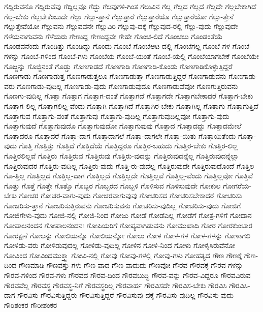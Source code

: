 {ಗೆದ್ದಿರುವನೊ
ಗೆದ್ದಿರುವೆವು
ಗೆದ್ದಿಲ್ಲವೊ
ಗೆದ್ದು
ಗೆಲವುಗಳಿ-ಗಿಂತ
ಗೆಲುವಿನ
ಗೆಲ್ಲ
ಗೆಲ್ಲದ
ಗೆಲ್ಲದೆ
ಗೆಲ್ಲದೇ
ಗೆಲ್ಲಬೇಕಾಗಿದೆ
ಗೆಲ್ಲ-ಬೇಕು
ಗೆಲ್ಲಬೇಕೆಂಬುದೇ
ಗೆಲ್ಲು
ಗೆಲ್ಲು-ತ್ತಾನೆ
ಗೆಲ್ಲುತ್ತಾರೆ
ಗೆಲ್ಲುತ್ತಾರೆಯೊ
ಗೆಲ್ಲುತ್ತಾರೆಯೋ
ಗೆಲ್ಲು-ತ್ತೇನೆ
ಗೆಲ್ಲುತ್ತೇವೆಯೋ
ಗೆಲ್ಲುವನು
ಗೆಲ್ಲುವವನೇ
ಗೆಲ್ಲುವಿರಿ
ಗೆಲ್ಲುವು-ದಕ್ಕೆ
ಗೆಲ್ಲುವುದ-ರಲ್ಲಿ
ಗೆಲ್ಲು-ವುದು
ಗೆಲ್ಲುವುದೇ
ಗೆಳೆಯನಾಗುವನು
ಗೆಳೆಯರು
ಗೇಣುದ್ದ
ಗೇಣುದ್ದವೇ
ಗೇಹೇ
ಗೊಂಚ-ಲಿದೆ
ಗೊಂಚಲು
ಗೊಂಡಂತೆಯೆ
ಗೊಂಡವನೆಂದು
ಗೊಂಡಿತ್ತು
ಗೊಂಡಿದ್ದು
ಗೊಂದು
ಗೊಂಬೆ
ಗೊಂಬೆಆಟ-ದಲ್ಲಿ
ಗೊಂಬೆಗಲ್ಲ
ಗೊಂಬೆ-ಗಳ
ಗೊಂಬೆ-ಗಳನ್ನು
ಗೊಂಬೆ-ಗಳಿಂದ
ಗೊಂಬೆ-ಗಳು
ಗೊಂಬೆಯ
ಗೊಂಬೆ-ಯಂತೆ
ಗೊಂಬೆ-ಯಲ್ಲಿ
ಗೊಂಬೆಯಾಗಬೇಕೆ
ಗೊಂಬೆಯೇ
ಗೊಜ್ಜನ್ನು
ಗೊಜ್ಜಿನಂತೆ
ಗೊಡ್ಡು
ಗೊಣಗಾಡದೆ
ಗೊಣಗಾಡಿ
ಗೊಣಗಾಡಿ-ಕೊಂಡು
ಗೊಣಗಾಡಿಕೊಳ್ಳುತ್ತಿದ್ದರೆ
ಗೊಣಗಾಡು
ಗೊಣಗಾಡುತ್ತ
ಗೊಣಗಾಡುತ್ತಲೂ
ಗೊಣಗಾಡುತ್ತಾ
ಗೊಣಗಾಡುತ್ತಿದ್ದರೆ
ಗೊಣಗಾಡುವನು
ಗೊಣಗಾಡು-ವರು
ಗೊಣಗಾಡು-ವುದಿಲ್ಲ
ಗೊಣಗಾಡು-ವುದು
ಗೊಣಗಾಡುವುದೂ
ಗೊಣಗಾಡುವೆವೋ
ಗೊಣಗುತ್ತಿರುವನು
ಗೊಣಗು-ವುದಿಲ್ಲ
ಗೊತ್ತಾ
ಗೊತ್ತಾಗ
ಗೊತ್ತಾಗ-ದಂತೆ
ಗೊತ್ತಾಗದೆ
ಗೊತ್ತಾಗದೇ
ಗೊತ್ತಾಗಬೇಕಾದರೆ
ಗೊತ್ತಾಗ-ಬೇಕು
ಗೊತ್ತಾಗ-ಲಿಲ್ಲ
ಗೊತ್ತಾಗಲಿಲ್ಲ-ವೆಂದು
ಗೊತ್ತಾಗಿ
ಗೊತ್ತಾಗಿದೆ
ಗೊತ್ತಾಗಿರ-ಬೇಕು
ಗೊತ್ತಾಗಿಲ್ಲ
ಗೊತ್ತಾಗು
ಗೊತ್ತಾಗುತ್ತಿದೆ
ಗೊತ್ತಾಗುವ
ಗೊತ್ತಾಗು-ವಂತೆ
ಗೊತ್ತಾಗುವು
ಗೊತ್ತಾಗು-ವುದಿಲ್ಲ
ಗೊತ್ತಾಗುವುದಿಲ್ಲವೋ
ಗೊತ್ತಾಗು-ವುದು
ಗೊತ್ತಾಗುವುದೆ
ಗೊತ್ತಾಗುವುದೊ
ಗೊತ್ತಾಗುವುದೋ
ಗೊತ್ತಾಗುವುವು
ಗೊತ್ತಾದ
ಗೊತ್ತಾದದ್ದು
ಗೊತ್ತಾದಮೇಲೆ
ಗೊತ್ತಾದರೂ
ಗೊತ್ತಾದರೆ
ಗೊತ್ತಾ-ದಾಗ
ಗೊತ್ತಾದಾಗಲೆ
ಗೊತ್ತಾ-ದಾಗಲೇ
ಗೊತ್ತಾ-ಯಿತು
ಗೊತ್ತಾಯಿತೆಂದು
ಗೊತ್ತಾ-ವುದು
ಗೊತ್ತಿ
ಗೊತ್ತಿತ್ತು
ಗೊತ್ತಿದೆ
ಗೊತ್ತಿದೆಯೆ
ಗೊತ್ತಿದ್ದರೂ
ಗೊತ್ತಿರ-ಬಹುದು
ಗೊತ್ತಿರ-ಬೇಕು
ಗೊತ್ತಿರ-ಲಿಲ್ಲ
ಗೊತ್ತಿರಲಿಲ್ಲವೆ
ಗೊತ್ತಿರು
ಗೊತ್ತಿರುವ
ಗೊತ್ತಿರುವು
ಗೊತ್ತಿರು-ವುದನ್ನು
ಗೊತ್ತಿರುವುದನ್ನೆಲ್ಲ
ಗೊತ್ತಿರುವುದನ್ನೆಲ್ಲಾ
ಗೊತ್ತಿರುವುದರ
ಗೊತ್ತಿರು-ವುದಿಲ್ಲ
ಗೊತ್ತಿರು-ವುದು
ಗೊತ್ತಿ-ರು-ವುದೆಲ್ಲ
ಗೊತ್ತಿರುವುದೇ
ಗೊತ್ತಿರುವುದೊಂದೆ
ಗೊತ್ತಿಲ
ಗೊ-ತ್ತಿಲ್ಲ
ಗೊತ್ತಿಲ್ಲದ
ಗೊತ್ತಿಲ್ಲ-ದಾಗ
ಗೊತ್ತಿಲ್ಲದೆ
ಗೊತ್ತಿಲ್ಲದೇ
ಗೊತ್ತಿಲ್ಲವೆ
ಗೊತ್ತಿಲ್ಲ-ವೆಂದು
ಗೊತ್ತಿಲ್ಲವೋ
ಗೊತ್ತಿವೆ
ಗೊತ್ತು
ಗೊತ್ತೆ
ಗೊತ್ತೇ
ಗೊತ್ತೊ
ಗೊಬ್ಬರ
ಗೊಬ್ಬರದ
ಗೊಬ್ಬಳಿ
ಗೊಳಿಸುವ
ಗೊಳಿಸುವುದೇ
ಗೋಕುಲ
ಗೋಗರೆಯ-ಬೇಕು
ಗೋಚರ
ಗೋಚರ-ವಾಗು-ವುದು
ಗೋಚರವಾಗುವುವು
ಗೋಚರಿಸದ
ಗೋಚರಿಸಬೇಕಾದರೆ
ಗೋಚರಿಸು
ಗೋಚರಿಸು-ತ್ತಾನೆ
ಗೋಚರಿಸುತ್ತಿರುವನು
ಗೋಚರಿಸುವನು
ಗೋಚರಿಸು-ವುದಿಲ್ಲ
ಗೋಚರಿಸು-ವುದು
ಗೋಜಿಗೆ
ಗೋಜಿಗೇಳು-ವುದು
ಗೋಜಿ-ನಲ್ಲಿ
ಗೋಜಿ-ನಿಂದ
ಗೋಜು
ಗೋಡೆ
ಗೋಡೆಎಲ್ಲ
ಗೋಡೆಗೆ
ಗೋತ್ರ-ಗಳಿಗೆ
ಗೋದಾನ
ಗೋಪಾಲನಂದನ
ಗೋಪಾಲನಂದನಃ
ಗೋಪಿಯರಿಗೆ
ಗೋಪ್ಯವಾಗಿಡುವನು
ಗೋಮುಖಾದಿ
ಗೋರ
ಗೋರಕುಂಬಾರ
ಗೋರಕ್ಷಣೆ
ಗೋಲನ್ನು
ಗೋಲಿಯನ್ನೊ
ಗೋಲಿಯನ್ನೋ
ಗೋಲು
ಗೋಳ
ಗೋಳ-ಗಳ
ಗೋಳ-ಗಳನ್ನು
ಗೋಳಾಗಲಿ
ಗೋಳಿಡು-ವರು
ಗೋಳಿಡುವುದಲ್ಲ
ಗೋಳಿಡು-ವುದಿಲ್ಲ
ಗೋಳಿನ
ಗೋಳಿ-ನಿಂದ
ಗೋಳು
ಗೋಳೈಸಿರುವೆನೋ
ಗೋವಿಂದ
ಗೋವಿಂದಮುಕ್ತ್ವಾ
ಗೋವಿ-ನಲ್ಲಿ
ಗೋವು
ಗೋವು-ಗಳಲ್ಲಿ
ಗೋವು-ಗಳು
ಗೋಹತ್ಯದ
ಗೌಣ
ಗೌಣಕ್ಕೆ
ಗೌಣ-ದಿಂದ
ಗೌಣಮಾಡಿ
ಗೌಣವಸ್ತು-ಗಳು
ಗೌಣ-ವಾದ
ಗೌಣ-ವಾದುದು
ಗೌಣವೋ
ಗೌರವ
ಗೌರವಕ್ಕೆ
ಗೌರವ-ಗಳನ್ನು
ಗೌರವ-ಗಳಿಂದ
ಗೌರವ-ಗಳು
ಗೌರವದ
ಗೌರವ-ದಿಂದ
ಗೌರವಬುದ್ಧಿ
ಗೌರವ-ವನ್ನು
ಗೌರವ-ವಿದ್ದರೂ
ಗೌರವವಿರುವ
ಗೌರವವೆಲ್ಲ
ಗೌರವಸ್ಥ
ಗೌರವಸ್ಥ-ನಿಗೆ
ಗೌರವಸ್ಥರಿಲ್ಲ
ಗೌರವಾರ್ಹ
ಗೌರವಿಸದೇ
ಗೌರವಿಸ-ಬೇಕು
ಗೌರವಿಸಿ
ಗೌರವಿಸಿ-ದಾಗ
ಗೌರವಿಸು
ಗೌರವಿಸುತ್ತಿದ್ದರು
ಗೌರವಿಸುತ್ತಿದ್ದರೆ
ಗೌರವಿಸುವು-ದಕ್ಕೆ
ಗೌರವಿಸು-ವುದಿಲ್ಲ
ಗೌರವಿಸು-ವುದು
ಗೌರಿಶಂಕರ
ಗೌರೀಶಂಕರ
}

